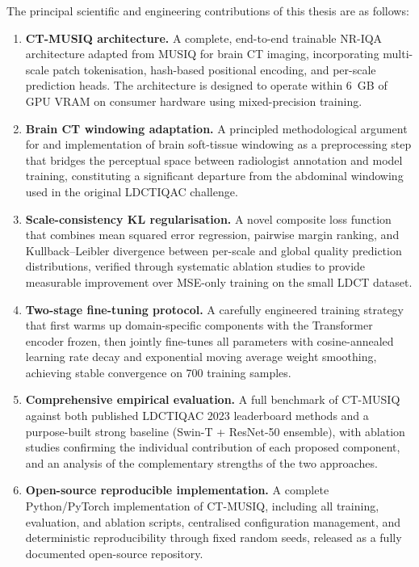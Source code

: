 The principal scientific and engineering contributions of this thesis are as follows:

\begin{enumerate}
    \item \textbf{CT-MUSIQ architecture.} A complete, end-to-end trainable NR-IQA
    architecture adapted from MUSIQ for brain CT imaging, incorporating multi-scale patch
    tokenisation, hash-based positional encoding, and per-scale prediction heads. The
    architecture is designed to operate within 6~GB of GPU VRAM on consumer hardware
    using mixed-precision training.

    \item \textbf{Brain CT windowing adaptation.} A principled methodological argument
    for and implementation of brain soft-tissue windowing as a preprocessing step that
    bridges the perceptual space between radiologist annotation and model training,
    constituting a significant departure from the abdominal windowing used in the original
    LDCTIQAC challenge.

    \item \textbf{Scale-consistency KL regularisation.} A novel composite loss function
    that combines mean squared error regression, pairwise margin ranking, and
    Kullback--Leibler divergence between per-scale and global quality prediction
    distributions, verified through systematic ablation studies to provide measurable
    improvement over MSE-only training on the small LDCT dataset.

    \item \textbf{Two-stage fine-tuning protocol.} A carefully engineered training
    strategy that first warms up domain-specific components with the Transformer encoder
    frozen, then jointly fine-tunes all parameters with cosine-annealed learning rate
    decay and exponential moving average weight smoothing, achieving stable convergence
    on 700 training samples.

    \item \textbf{Comprehensive empirical evaluation.} A full benchmark of CT-MUSIQ
    against both published LDCTIQAC 2023 leaderboard methods and a purpose-built strong
    baseline (Swin-T + ResNet-50 ensemble), with ablation studies confirming the
    individual contribution of each proposed component, and an analysis of the
    complementary strengths of the two approaches.

    \item \textbf{Open-source reproducible implementation.} A complete Python/PyTorch
    implementation of CT-MUSIQ, including all training, evaluation, and ablation scripts,
    centralised configuration management, and deterministic reproducibility through
    fixed random seeds, released as a fully documented open-source repository.
\end{enumerate}

